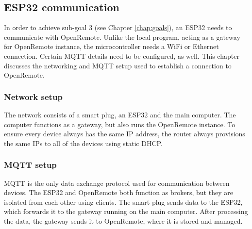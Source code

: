 \subsection{ESP32 communication}
In order to achieve sub-goal 3 (see Chapter \ref{chap:goals}), an ESP32 needs to communicate with OpenRemote. Unlike the local program, acting as a gateway for OpenRemote instance, the microcontroller needs a WiFi or Ethernet connection. Certain MQTT details need to be configured, as well. This chapter discusses the networking and MQTT setup used to establish a connection to OpenRemote.

\subsubsection{Network setup}
The network consists of a smart plug, an ESP32 and the main computer. The computer functions as a gateway, but also runs the OpenRemote instance. To ensure every device always has the same IP address, the router always provisions the same IPs to all of the devices using static DHCP.

\subsubsection{MQTT setup}
MQTT is the only data exchange protocol used for communication between devices. The ESP32 and OpenRemote both function as brokers, but they are isolated from each other using clients. The smart plug sends data to the ESP32, which forwards it to the gateway running on the main computer. After processing the data, the gateway sends it to OpenRemote, where it is stored and managed. 